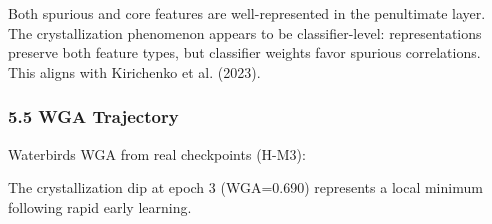 Both spurious and core features are well-represented in the penultimate layer. The crystallization phenomenon appears to be classifier-level: representations preserve both feature types, but classifier weights favor spurious correlations. This aligns with Kirichenko et al. (2023).

\subsubsection{5.5 WGA Trajectory}

Waterbirds WGA from real checkpoints (H-M3):

\begin{table}[htbp]
\centering
{}
\end{table}

The crystallization dip at epoch 3 (WGA=0.690) represents a local minimum following rapid early learning.

